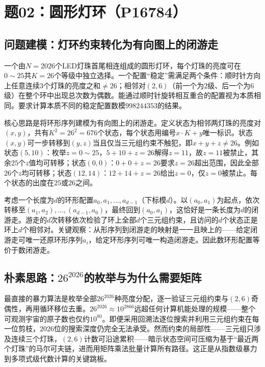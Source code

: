\section{题02：圆形灯环（P16784）}

\subsection{问题建模：灯环约束转化为有向图上的闭游走}

一个由$N=2026$个LED灯珠首尾相连组成的圆形灯环，每个灯珠的亮度可在$0\sim 25$共$K=26$个等级中独立选择。一个配置“稳定”需满足两个条件：顺时针方向上任意连续$3$个灯珠的亮度之和$\neq 26$；相邻对$(2,6)$（前一个为$2$级、后一个为$6$级）在整个环中出现总次数为偶数。能通过顺时针旋转相互重合的配置视为本质相同。要求计算本质不同的稳定配置数模$998244353$的结果。

核心思路是将环形序列建模为有向图上的闭游走。定义状态为相邻两灯珠的亮度对$(x,y)$，共有$K^2=26^2=676$个状态，每个状态用编号$x\cdot K+y$唯一标识。状态$(x,y)$可一步转移到$(y,z)$当且仅当三元组约束不触犯，即$x+y+z\neq 26$。例如状态$(5,10)$：枚举$z=0\sim 25$，$5+10+z=26$解得$z=11$，故$z=11$被禁止，其余$25$个$z$值均可转移；状态$(0,0)$：$0+0+z=26$要求$z=26$超出范围，因此全部$26$个$z$均可转移；状态$(12,14)$：$12+14+z=26$给出$z=0$，仅$z=0$被禁止。每个状态的出度在$25$或$26$之间。

考虑一个长度为$d$的环形配置$a_0,a_1,\dots,a_{d-1}$（下标模$d$）。以$(a_0,a_1)$为起点，依次转移至$(a_1,a_2),\dots,(a_{d-1},a_0)$，最终回到$(a_0,a_1)$，这恰好是一条长度为$d$的闭游走。游走的$d$次转移依次检验了环上全部$d$个三元组约束，且访问的$d$个状态正是环上$d$个相邻对。关键观察：从形序列到闭游走的映射是一一且映上的——给定闭游走可唯一还原环形序列$a_i$，给定环形序列可唯一构造闭游走。因此数环形配置等价于数闭游走。

\subsection{朴素思路：$26^{2026}$的枚举与为什么需要矩阵}

最直接的暴力算法是枚举全部$26^{2026}$种亮度分配，逐一验证三元组约束与$(2,6)$奇偶性，再用循环移位去重。$26^{2026}\approx 10^{2866}$远超任何计算机能处理的规模——整个可观测宇宙的原子数也仅约$10^{80}$。即便采用回溯法逐位搜索并利用三元组约束在每一位剪枝，$2026$位的搜索深度仍完全无法承受。然而约束的局部性——三元组只涉及连续三个灯珠，$(2,6)$计数可沿途累积——暗示状态空间可压缩为基于“最近两个灯珠”的马尔可夫链，进而用矩阵乘法批量计算所有路径。这正是从指数级暴力到多项式级代数计算的关键跳板。

